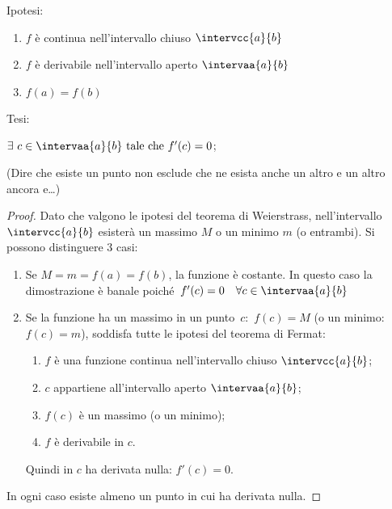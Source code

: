 \vspace*{-20mm}                           %
\noindent \begin{minipage}{.49\textwidth}
\noindent Ipotesi:
\begin{enumerate}[nosep]
 \item \(f\) è continua nell'intervallo chiuso \(\intervcc{a}{b}\)
 \item \(f\) è derivabile nell'intervallo aperto \(\intervaa{a}{b}\)
 \item \(f(a)=f(b)\)
\end{enumerate}

\noindent Tesi: 

\hspace{4mm}\(\exists~c \in \intervaa{a}{b} \text{ tale che } f'(c)=0\);

\vspace{1em}
(Dire che esiste un punto non esclude che ne esista anche un altro e un 
altro ancora e\dots)
\end{minipage}
\hfill
\begin{minipage}{.49\textwidth}
\vspace{-15mm}
\begin{center} \trolle \end{center}
\end{minipage}

\vspace{-15mm}                           %
\begin{proof}
Dato che valgono le ipotesi del teorema di Weierstrass, 
nell'intervallo \(\intervcc{a}{b}\) 
esisterà un massimo \(M\) o un minimo \(m\) (o entrambi).
Si possono distinguere 3 casi:
\begin{enumerate} %
\item Se \(M = m = f(a) = f(b)\), la funzione è costante. 
In questo caso la dimostrazione è banale 
poiché~\(f'(c)=0 \quad \forall c \in \intervaa{a}{b}\)

\item Se la funzione ha un massimo in un punto~\(c\):~\(f(c)=M\) 
(o un minimo:~\(f(c)=m\)), 
soddisfa tutte le ipotesi del teorema di Fermat: 
\begin{enumerate}[noitemsep]
\item \(f\) è una funzione continua nell'intervallo chiuso 
\(\intervcc{a}{b}\);
\item \(c\) appartiene all'intervallo aperto \(\intervaa{a}{b}\);
\item \(f(c)\) è un massimo (o un minimo);
\item \(f\) è derivabile in \(c\).
\end{enumerate}
Quindi in \(c\) ha derivata nulla: \(f'(c)=0\).
% 
\end{enumerate}
In ogni caso esiste almeno un punto in cui ha derivata nulla.
\end{proof}

